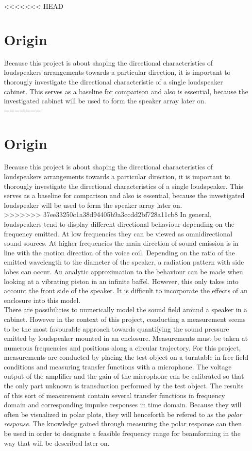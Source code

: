 <<<<<<< HEAD
\section{Origin}\label{ch:polar_response}
Because this project is about shaping the directional characteristics of loudspeakers arrangements towards a particular direction, it is important to thorougly investigate the directional characteristic of a single loudspeaker cabinet. This serves as a baseline for comparison and also is essential, because the investigated cabinet will be used to form the speaker array later on.\\
=======
\section{Origin}
Because this project is about shaping the directional characteristics of loudspeakers arrangements towards a particular direction, it is important to thorougly investigate the directional characteristics of a single loudspeaker. This serves as a baseline for comparison and also is essential, because the investigated loudspeaker will be used to form the speaker array later on.\\
>>>>>>> 37ee33250c1a38d94405b9a3ccdd2bf728a11cb8
In general, loudspeakers tend to display different directional behaviour depending on the frequency emitted. At low frequencies they can be viewed as omnidirectional sound sources. At higher frequencies the main direction of sound emission is in line with the motion direction of the voice coil. \citep[p. 910 f.]{crocker98}
Depending on the ratio of the emitted wavelength to the diameter of the speaker, a radiation pattern with side lobes can occur. An analytic approximation to the behaviour can be made  when looking at a vibrating piston in an infinite baffel. However, this only takes into account the front side of the speaker. It is difficult to incorporate the effects of an enclosure into this model.\\
There are possibilities to numerically model the sound field around a speaker in a cabinet. However in the context of this project, conducting a measurement seems to be the most favourable approach towards quantifying the sound pressure emitted by loudspeaker mounted in an enclosure. Measurements must be taken at numerous frequencies and positions along a circular trajectory.
For this project, measurements are conducted by placing the test object on a turntable in free field conditions and measuring transfer functions with a microphone. The voltage output of the amplifier and the gain of the microphone can be calibrated so that the only part unknown is transduction performed by the test object. The results of this sort of measurement contain several transfer functions in frequency domain and corresponding impulse responses in time domain. Because they will often be visualized in polar plots, they will henceforth be refered to as the \textit{polar response}.
The knowledge gained through measuring the polar response can then be used in order to designate a feasible frequency range for beamforming in the way that will be described later on. 

